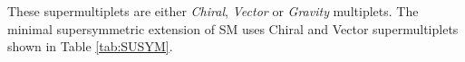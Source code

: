 {%

These supermultiplets are either \textit{Chiral}, \textit{Vector} or \textit{Gravity} multiplets. The minimal supersymmetric extension of SM uses Chiral and Vector supermultiplets shown in Table \ref{tab:SUSYM}.

}
